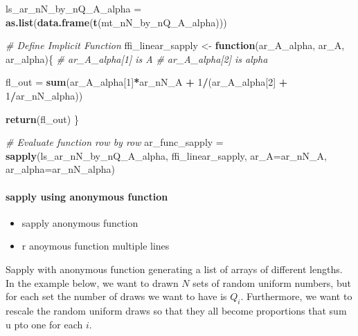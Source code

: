 \documentclass[
]{book}
\newenvironment{Shaded}{\begin{snugshade}}{\end{snugshade}}
\newcommand{\CommentTok}[1]{\textcolor[rgb]{0.56,0.35,0.01}{\textit{#1}}}
\newcommand{\ControlFlowTok}[1]{\textcolor[rgb]{0.13,0.29,0.53}{\textbf{#1}}}
\newcommand{\DataTypeTok}[1]{\textcolor[rgb]{0.13,0.29,0.53}{#1}}
\newcommand{\DecValTok}[1]{\textcolor[rgb]{0.00,0.00,0.81}{#1}}
\newcommand{\KeywordTok}[1]{\textcolor[rgb]{0.13,0.29,0.53}{\textbf{#1}}}
\newcommand{\NormalTok}[1]{#1}
\newcommand{\OperatorTok}[1]{\textcolor[rgb]{0.81,0.36,0.00}{\textbf{#1}}}
\newcommand{\StringTok}[1]{\textcolor[rgb]{0.31,0.60,0.02}{#1}}
\providecommand{\tightlist}{%
  \setlength{\itemsep}{0pt}\setlength{\parskip}{0pt}}
\begin{document}
\begin{Shaded}
\begin{Highlighting}[]
\NormalTok{ls_ar_nN_by_nQ_A_alpha =}\StringTok{ }\KeywordTok{as.list}\NormalTok{(}\KeywordTok{data.frame}\NormalTok{(}\KeywordTok{t}\NormalTok{(mt_nN_by_nQ_A_alpha)))}

\CommentTok{# Define Implicit Function}
\NormalTok{ffi_linear_sapply <-}\StringTok{ }\ControlFlowTok{function}\NormalTok{(ar_A_alpha, ar_A, ar_alpha)\{}
  \CommentTok{# ar_A_alpha[1] is A}
  \CommentTok{# ar_A_alpha[2] is alpha}

\NormalTok{  fl_out =}\StringTok{ }\KeywordTok{sum}\NormalTok{(ar_A_alpha[}\DecValTok{1}\NormalTok{]}\OperatorTok{*}\NormalTok{ar_nN_A }\OperatorTok{+}
\StringTok{                 }\DecValTok{1}\OperatorTok{/}\NormalTok{(ar_A_alpha[}\DecValTok{2}\NormalTok{] }\OperatorTok{+}\StringTok{ }\DecValTok{1}\OperatorTok{/}\NormalTok{ar_nN_alpha))}

  \KeywordTok{return}\NormalTok{(fl_out)}
\NormalTok{\}}

\CommentTok{# Evaluate function row by row}
\NormalTok{ar_func_sapply =}\StringTok{ }\KeywordTok{sapply}\NormalTok{(ls_ar_nN_by_nQ_A_alpha, ffi_linear_sapply,}
                        \DataTypeTok{ar_A=}\NormalTok{ar_nN_A, }\DataTypeTok{ar_alpha=}\NormalTok{ar_nN_alpha)}
\end{Highlighting}
\end{Shaded}

\hypertarget{sapply-using-anonymous-function}{%
\paragraph{sapply using anonymous function}\label{sapply-using-anonymous-function}}

\begin{itemize}
\tightlist
\item
  sapply anonymous function
\item
  r anoymous function multiple lines
\end{itemize}

Sapply with anonymous function generating a list of arrays of different lengths. In the example below, we want to drawn \(N\) sets of random uniform numbers, but for each set the number of draws we want to have is \(Q_i\). Furthermore, we want to rescale the random uniform draws so that they all become proportions that sum u pto one for each \(i\).
\end{document}
